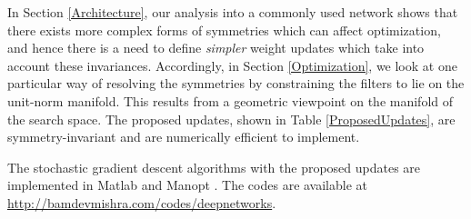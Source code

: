 \documentclass{article} %
\newcommand{\changeBM}[1]{#1} %
\newcommand{\changeVB}[1]{#1} %
\begin{document}
  
\changeBM{In Section \ref{Architecture},} our analysis into a commonly used network \changeBM{shows that} there \changeBM{exists} more complex forms of symmetries which can affect optimization, and hence there is a need to define \changeBM{\emph{simpler}} weight updates which take into account these invariances. \changeBM{Accordingly, in Section \ref{Optimization}, we look at \changeBM{one particular} way of resolving the symmetries} \changeVB{by constraining the filters to lie on \changeBM{the} unit-norm manifold. This results from a geometric viewpoint on the manifold of the search space. The proposed \changeBM{updates, shown in Table \ref{ProposedUpdates}, are symmetry-invariant and are} numerically efficient to implement.}


\changeBM{The stochastic gradient descent algorithms with the proposed updates are implemented in Matlab and Manopt \cite{ManOpt}. The codes are available at \url{http://bamdevmishra.com/codes/deepnetworks}.}



\end{document}
